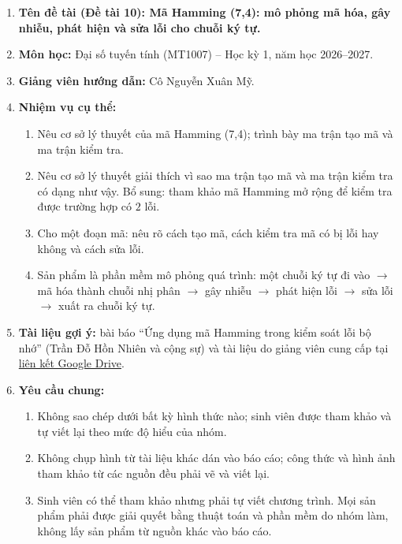 
\begin{enumerate}[leftmargin=1.2cm,itemsep=3pt]
  \item \textbf{Tên đề tài (Đề tài 10): Mã Hamming (7,4): mô phỏng mã hóa, gây
        nhiễu, phát hiện và sửa lỗi cho chuỗi ký tự.}
  \item \textbf{Môn học:} Đại số tuyến tính (MT1007) -- Học kỳ 1, năm học
        2026--2027.
  \item \textbf{Giảng viên hướng dẫn:} Cô Nguyễn Xuân Mỹ.
  \item \textbf{Nhiệm vụ cụ thể:}
        \begin{enumerate}[label=\arabic{enumi}.\arabic*.,leftmargin=1.2cm]
          \item Nêu cơ sở lý thuyết của mã Hamming (7,4); trình bày ma trận tạo
                mã và ma trận kiểm tra.
          \item Nêu cơ sở lý thuyết giải thích vì sao ma trận tạo mã và ma trận
                kiểm tra có dạng như vậy. Bổ sung: tham khảo mã Hamming mở rộng
                để kiểm tra được trường hợp có $2$ lỗi.
          \item Cho một đoạn mã: nêu rõ cách tạo mã, cách kiểm tra mã có bị lỗi
                hay không và cách sửa lỗi.
          \item Sản phẩm là phần mềm mô phỏng quá trình: một chuỗi ký tự đi vào
                $\rightarrow$ mã hóa thành chuỗi nhị phân $\rightarrow$ gây
                nhiễu $\rightarrow$ phát hiện lỗi $\rightarrow$ sửa lỗi
                $\rightarrow$ xuất ra chuỗi ký tự.
        \end{enumerate}
  \item \textbf{Tài liệu gợi ý:} bài báo ``Ứng dụng mã Hamming trong kiểm soát
        lỗi bộ nhớ'' (Trần Đỗ Hồn Nhiên và cộng sự) và tài liệu do giảng viên
        cung cấp tại
        \href{https://drive.google.com/file/d/1JExRyxYQcP4sspD4K_Ssjy__ME6sZYpr/view?usp=drive_link}{liên kết
        Google Drive}.
  \item \textbf{Yêu cầu chung:}
        \begin{enumerate}[label=\arabic{enumi}.\arabic*.,leftmargin=1.2cm]
          \item Không sao chép dưới bất kỳ hình thức nào; sinh viên được tham
                khảo và tự viết lại theo mức độ hiểu của nhóm.
          \item Không chụp hình từ tài liệu khác dán vào báo cáo; công thức và
                hình ảnh tham khảo từ các nguồn đều phải vẽ và viết lại.
          \item Sinh viên có thể tham khảo nhưng phải tự viết chương trình. Mọi
                sản phẩm phải được giải quyết bằng thuật toán và phần mềm do
                nhóm làm, không lấy sản phẩm từ nguồn khác vào báo cáo.
        \end{enumerate}
\end{enumerate}
